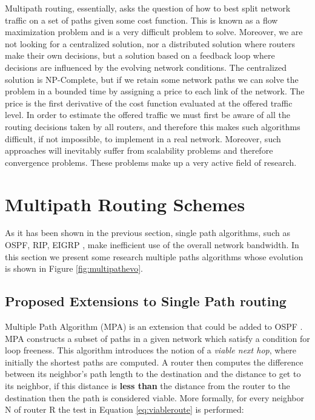 Multipath routing, essentially, asks the question of how to best split network traffic on a set of paths given some cost function. This is known as a flow maximization problem and is a very difficult problem to solve. Moreover, we are not looking for a centralized solution, nor a distributed solution where routers make their own decisions, but a solution based on a feedback loop where decisions are influenced by the evolving network conditions. The centralized solution is NP-Complete, but if we retain some network paths we can solve the problem in a bounded time by assigning a price to each link of the network. The price is the first derivative of the cost function evaluated at the offered traffic level. In order to estimate the offered traffic we must first be aware of all the routing decisions taken by all routers, and therefore this makes such algorithms difficult, if not impossible, to implement in a real network. Moreover, such approaches will inevitably suffer from scalability problems and therefore convergence problems. These problems make up a very active field of research.    


\section{Multipath Routing Schemes}

As it has been shown in the previous section, single path algorithms, such as OSPF, RIP, EIGRP \cite{RIP,OSPF,EIGRP}, make inefficient use of the overall network bandwidth. In this section we present some research multiple paths algorithms whose evolution is shown in Figure \ref{fig:multipathevo}. 


\subsection{Proposed Extensions to Single Path routing}

Multiple Path Algorithm (MPA) \cite{MPA} is an extension that could be added to OSPF \cite{OSPF}. MPA constructs a subset of paths in a given network which satisfy a condition for loop freeness. This algorithm introduces the notion of a \textit{viable next hop}, where initially the shortest paths are computed. A router then computes the difference between its neighbor's path length to the destination and the distance to get to its neighbor, if this distance is \textbf{less than} the distance from the router to the destination then the path is considered viable. More formally, for every neighbor N of router R the test in Equation \ref{eq:viableroute} is performed:

